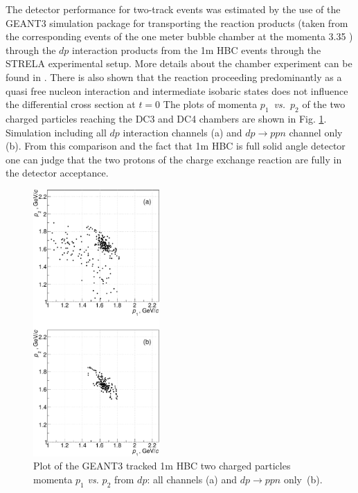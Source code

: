 \documentclass[twocolumn,epjc3]{svjour3}
\newcommand{\dpfrag} {\ensuremath{dp \rightarrow ppn}\xspace}
\newcommand{\dpchex} {\ensuremath{dp \rightarrow (pp)n}\xspace}
\newcommand{\GeVc}   {Ge\kern-.1emV/c\xspace}
\providecommand{\DIFaddtex}[1]{{\protect\color{Green} \sf #1}} %
\providecommand{\DIFdeltex}[1]{{\protect\color{Red} \scriptsize #1}} %
\providecommand{\DIFaddbegin}{} %
\providecommand{\DIFaddend}{} %
\providecommand{\DIFdelbegin}{} %
\providecommand{\DIFdelend}{} %
\providecommand{\DIFaddFL}[1]{\DIFadd{#1}} %
\providecommand{\DIFadd}[1]{\texorpdfstring{\DIFaddtex{#1}}{#1}} %
\providecommand{\DIFdel}[1]{\texorpdfstring{\DIFdeltex{#1}}{}} %
\newcommand{\DIFscaledelfig}{0.5}
\newlength{\DIFdelgraphicswidth} %
\newlength{\DIFdelgraphicsheight} %
\newcommand{\DIFaddincludegraphics}[2][]{{\color{blue}\fbox{\DIFOincludegraphics[#1]{#2}}}} %
\newcommand{\DIFdelincludegraphics}[2][]{%
\sbox{\DIFdelgraphicsbox}{\DIFOincludegraphics[#1]{#2}}%
\settoboxwidth{\DIFdelgraphicswidth}{\DIFdelgraphicsbox} %
\settoboxtotalheight{\DIFdelgraphicsheight}{\DIFdelgraphicsbox} %
\scalebox{\DIFscaledelfig}{%
\parbox[b]{\DIFdelgraphicswidth}{\usebox{\DIFdelgraphicsbox}\\[-\baselineskip] \rule{\DIFdelgraphicswidth}{0em}}\llap{\resizebox{\DIFdelgraphicswidth}{\DIFdelgraphicsheight}{%
\setlength{\unitlength}{\DIFdelgraphicswidth}%
\begin{picture}(1,1)%
\thicklines\linethickness{2pt} %
{\color[rgb]{1,0,0}\put(0,0){\framebox(1,1){}}}%
{\color[rgb]{1,0,0}\put(0,0){\line( 1,1){1}}}%
{\color[rgb]{1,0,0}\put(0,1){\line(1,-1){1}}}%
\end{picture}%
}\hspace*{3pt}}} %
} %
\DeclareRobustCommand{\DIFaddbegin}{\DIFOaddbegin \let\includegraphics\DIFaddincludegraphics} %
\DeclareRobustCommand{\DIFaddend}{\DIFOaddend \let\includegraphics\DIFOincludegraphics} %
\DeclareRobustCommand{\DIFdelbegin}{\DIFOdelbegin \let\includegraphics\DIFdelincludegraphics} %
\DeclareRobustCommand{\DIFdelend}{\DIFOaddend \let\includegraphics\DIFOincludegraphics} %
\begin{document}
\DIFadd{The detector performance for two-track events was }\DIFaddend estimated by the use of the
GEANT3 \DIFdelbegin \DIFdel{simulation }\DIFdelend package for transporting the \DIFdelbegin \DIFdel{reaction products (taken from the corresponding events of the one meter bubble chamber at the
momenta 3.35 }%
\DIFdel{) through the }\DIFdelend \DIFaddbegin \DIFadd{$dp$ interaction products from the 1m HBC
events through the STRELA }\DIFaddend experimental setup. \DIFdelbegin \DIFdel{More details about the chamber experiment can be found in \cite{gla02,gla08}. There is also shown that the }%
\DIFdel{reaction proceeding predominantly as a quasi free nucleon
interaction and intermediate isobaric states does not influence the differential
cross section at $t = 0$}\DIFdelend \DIFaddbegin \DIFadd{The plots of momenta
$p_1$~\textit{vs.}~$p_2$ of the two charged particles reaching the DC3 and DC4
chambers are shown in Fig. \ref{fig:p1vsp2_sim}. Simulation including all $dp$
interaction channels (a) and }\dpfrag \DIFadd{channel only (b). From this comparison and
the fact that 1m HBC is full solid angle detector one can judge that the two
protons of the charge exchange reaction are fully in the detector acceptance}\DIFaddend .

\DIFaddbegin \begin{figure}[t]
  \centering
  \includegraphics[width=0.43\textwidth]{p1_vs_p2_1.pdf}
  \caption{\DIFaddFL{Plot of the GEANT3 tracked 1m HBC two charged particles momenta $p_1$
    \textit{vs.} $p_2$ from $dp$: all channels (a) and }\dpfrag \DIFaddFL{only~(b).}}
  \label{fig:p1vsp2_sim}
\end{figure}
\end{document}
